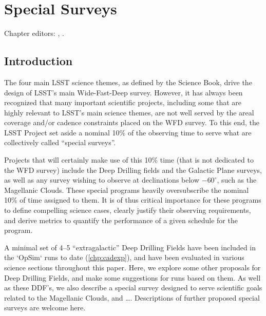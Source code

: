 \chapter[Special Surveys]{Special Surveys}
\def\chpname{specialsurveys}\label{chp:\chpname}

Chapter editors:
,
.




\section{Introduction}
\label{sec:specials:intro}


The four main LSST science themes, as defined by the Science Book,
drive the design of LSST's main Wide-Fast-Deep survey.  However, it
has always been recognized that many important scientific projects,
including some that are highly relevant to LSST's main science themes,
are not well served by the areal coverage and/or cadence constraints
placed on the WFD survey.  To this end, the LSST Project set aside a
nominal 10\% of the observing time to serve what are collectively
called ``special surveys''.

Projects that
will certainly make use of this 10\% time (that is not dedicated to the WFD
survey) include the Deep Drilling fields and the Galactic Plane surveys, as well as any survey wishing to
observe at declinations below $-60^\circ$, such as the Magellanic
Clouds.  These special programs heavily oversubscribe the nominal 10\%
of time assigned to them.  It is of thus critical importance for these
programs to define compelling science cases, clearly justify their
observing requirements, and derive metrics to quantify the performance
of a given schedule for the program.

A minimal set of 4--5 ``extragalactic'' Deep Drilling Fields have been
included in the `OpSim` runs to date (\autoref{chp:cadexp}), and have
been evaluated in various science sections throughout this paper.
Here, we explore some other proposals for Deep Drilling Fields, and
make some suggestions for \OpSim runs based on them. As well as these
DDF's, we also describe a special survey designed to serve scientific
goals related to the Magellanic Clouds, and \ldots.  Descriptions of
further proposed special surveys are welcome here.

